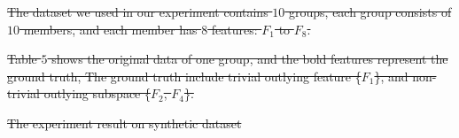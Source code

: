 \documentclass[
 size=14pt,
 paper=smartboard,  %
 mode=present, 		%
 display=slides, 	%
 style=tuliplab,  	%
 pauseslide,
 fleqn,leqno]{powerdot}
\providecommand{\DIFdeltex}[1]{{\protect\color{red}\sout{#1}}}                      %
\providecommand{\DIFdelbegin}{} %
\providecommand{\DIFdelend}{} %
\providecommand{\DIFdelFL}[1]{\DIFdel{#1}} %
\providecommand{\DIFdelendFL}{} %
\providecommand{\DIFdel}[1]{\texorpdfstring{\DIFdeltex{#1}}{}} %
\newcommand{\DIFscaledelfig}{0.5}
\newlength{\DIFdelgraphicswidth} %
\newlength{\DIFdelgraphicsheight} %
\newcommand{\DIFdelincludegraphics}[2][]{%
\sbox{\DIFdelgraphicsbox}{\DIFOincludegraphics[#1]{#2}}%
\settoboxwidth{\DIFdelgraphicswidth}{\DIFdelgraphicsbox} %
\settoboxtotalheight{\DIFdelgraphicsheight}{\DIFdelgraphicsbox} %
\scalebox{\DIFscaledelfig}{%
\parbox[b]{\DIFdelgraphicswidth}{\usebox{\DIFdelgraphicsbox}\\[-\baselineskip] \rule{\DIFdelgraphicswidth}{0em}}\llap{\resizebox{\DIFdelgraphicswidth}{\DIFdelgraphicsheight}{%
\setlength{\unitlength}{\DIFdelgraphicswidth}%
\begin{picture}(1,1)%
\thicklines\linethickness{2pt} %
{\color[rgb]{1,0,0}\put(0,0){\framebox(1,1){}}}%
{\color[rgb]{1,0,0}\put(0,0){\line( 1,1){1}}}%
{\color[rgb]{1,0,0}\put(0,1){\line(1,-1){1}}}%
\end{picture}%
}\hspace*{3pt}}} %
} %
\DeclareRobustCommand{\DIFdelbegin}{\DIFOdelbegin \let\includegraphics\DIFdelincludegraphics} %
\DeclareRobustCommand{\DIFdelend}{\DIFOaddend \let\includegraphics\DIFOincludegraphics} %
\DeclareRobustCommand{\DIFdelendFL}{\DIFOaddendFL \let\includegraphics\DIFOincludegraphics} %
\begin{document}
\DIFdelbegin \DIFdel{The dataset we used in our experiment contains $10$ groups,
each group consists of $10$ members,
and each member has $8$ features: $F_1$ to $F_8$.
}%

\DIFdel{Table $5$ shows the original data of one group,
and the bold features represent the ground truth,
The ground truth include trivial outlying feature \{$F_1$\},
and non-trivial outlying subspace \{$F_2$, $F_4$\}.
}%

\DIFdelend %


\DIFdelbegin %
\DIFdelend %

\DIFdelbegin %
{%
\DIFdelFL{The experiment result on synthetic dataset}}
\DIFdelendFL %
\end{document}
